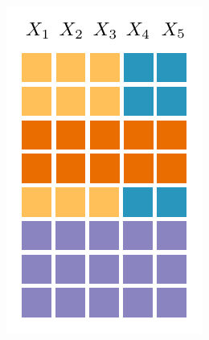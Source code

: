 \documentclass[final]{beamer}
\begin{document}
\begin{frame}{}
\begin{textblock}{60}
{\begin{minipage}[t]{5.67cm}
    \end{minipage}}\hspace{30pt}\begin{minipage}[t]{4.986cm}
      \includegraphics[width=\linewidth]{figures/grid-2}
    \end{minipage}\hspace{30pt}\raisebox{42pt}{\begin{minipage}[t]{6.48cm}

\end{minipage}}
\end{textblock}
\end{frame}
\end{document}
